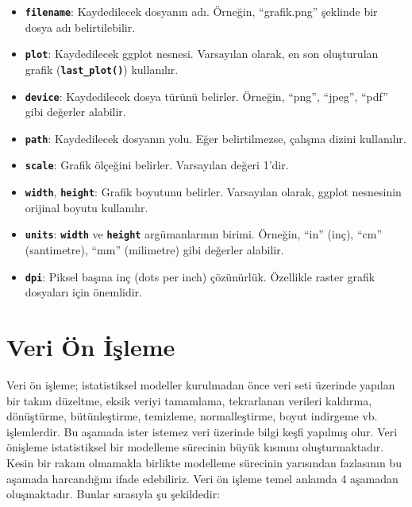 \documentclass[
  letterpaper,
  DIV=11,
  numbers=noendperiod]{scrreprt}
\begin{document}
\begin{itemize}
\item
  \textbf{\texttt{filename}}: Kaydedilecek dosyanın adı. Örneğin,
  ``grafik.png'' şeklinde bir dosya adı belirtilebilir.
\item
  \textbf{\texttt{plot}}: Kaydedilecek ggplot nesnesi. Varsayılan
  olarak, en son oluşturulan grafik (\textbf{\texttt{last\_plot()}})
  kullanılır.
\item
  \textbf{\texttt{device}}: Kaydedilecek dosya türünü belirler. Örneğin,
  ``png'', ``jpeg'', ``pdf'' gibi değerler alabilir.
\item
  \textbf{\texttt{path}}: Kaydedilecek dosyanın yolu. Eğer
  belirtilmezse, çalışma dizini kullanılır.
\item
  \textbf{\texttt{scale}}: Grafik ölçeğini belirler. Varsayılan değeri
  1'dir.
\item
  \textbf{\texttt{width}}, \textbf{\texttt{height}}: Grafik boyutunu
  belirler. Varsayılan olarak, ggplot nesnesinin orijinal boyutu
  kullanılır.
\item
  \textbf{\texttt{units}}: \textbf{\texttt{width}} ve
  \textbf{\texttt{height}} argümanlarının birimi. Örneğin, ``in'' (inç),
  ``cm'' (santimetre), ``mm'' (milimetre) gibi değerler alabilir.
\item
  \textbf{\texttt{dpi}}: Piksel başına inç (dots per inch) çözünürlük.
  Özellikle raster grafik dosyaları için önemlidir.
\end{itemize}


\chapter*{Veri Ön İşleme}\label{veri-uxf6n-iux15fleme}


Veri ön işleme; istatistiksel modeller kurulmadan önce veri seti
üzerinde yapılan bir takım düzeltme, eksik veriyi tamamlama, tekrarlanan
verileri kaldırma, dönüştürme, bütünleştirme, temizleme, normalleştirme,
boyut indirgeme vb. işlemlerdir. Bu aşamada ister istemez veri üzerinde
bilgi keşfi yapılmış olur. Veri önişleme istatistiksel bir modelleme
sürecinin büyük kısmını oluşturmaktadır. Kesin bir rakam olmamakla
birlikte modelleme sürecinin yarısından fazlasının bu aşamada
harcandığını ifade edebiliriz. Veri ön işleme temel anlamda 4 aşamadan
oluşmaktadır. Bunlar sırasıyla şu şekildedir:
\end{document}

